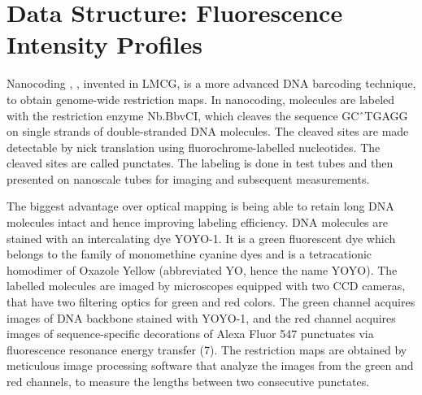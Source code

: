 \chapter{Data Structure: Fluorescence Intensity Profiles}

Nanocoding \cite{Jo_etal_2007_PNAS}, \cite{Jo_etal_2009}, invented in LMCG, is a more advanced DNA barcoding technique, to obtain genome-wide restriction maps. In nanocoding, molecules are labeled with the restriction enzyme Nb.BbvCI, which cleaves the sequence GC\^\ TGAGG on single strands of double-stranded DNA molecules. The cleaved sites are made detectable by nick translation using fluorochrome-labelled nucleotides. The cleaved sites are called punctates. The labeling is done in test tubes and then presented on nanoscale tubes for imaging and subsequent measurements. 

The biggest advantage over optical mapping is being able to retain long DNA molecules intact and hence improving labeling efficiency. DNA molecules are stained with an intercalating dye YOYO-1. It is a green fluorescent dye which belongs to the family of monomethine cyanine dyes and is a tetracationic homodimer of Oxazole Yellow (abbreviated YO, hence the name YOYO). The labelled molecules are imaged by microscopes equipped with two CCD cameras, that have two filtering optics for green and red colors. The green channel acquires images of DNA backbone stained with YOYO-1, and the red channel acquires images of sequence-specific decorations of Alexa Fluor 547 punctuates via fluorescence resonance energy transfer (7). The restriction maps are obtained by meticulous image processing software that analyze the images from the green and red channels, to measure the lengths between two consecutive punctates.  \\



